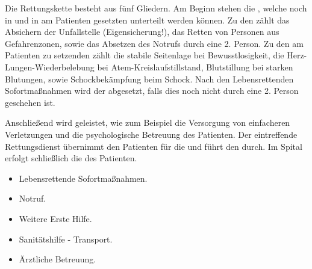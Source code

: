 {
Die Rettungskette besteht aus fünf Gliedern. 
Am Beginn stehen die , welche noch in
 und in am Patienten gesetzten  unterteilt werden können. Zu den  zählt 
das Absichern der Unfallstelle (Eigensicherung!), das
Retten von Personen aus Gefahrenzonen, sowie das Absetzen des Notrufs durch
eine 2. Person. Zu den am Patienten zu setzenden
 zählt die stabile Seitenlage bei Bewusstlosigkeit, die
Herz-Lungen-Wiederbelebung bei Atem-Kreislaufstillstand, Blutstillung bei
starken Blutungen, sowie Schockbekämpfung beim Schock. Nach den Lebensrettenden
Sofortmaßnahmen wird der  abgesetzt, falls dies
noch nicht durch eine 2. Person geschehen ist.

Anschließend wird 
 geleistet, wie zum Beispiel die
Versorgung von einfacheren Verletzungen und die psychologische Betreuung des
Patienten. Der eintreffende Rettungsdienst übernimmt den Patienten für die  und führt den
 durch. Im Spital erfolgt schließlich die
 des Patienten. 

}{
\begin{itemize}
    \item Lebensrettende Sofortmaßnahmen.
    \item Notruf.
    \item Weitere Erste Hilfe.
    \item Sanitätshilfe - Transport.
    \item Ärztliche Betreuung.
\end{itemize}
}
{}{}{}





